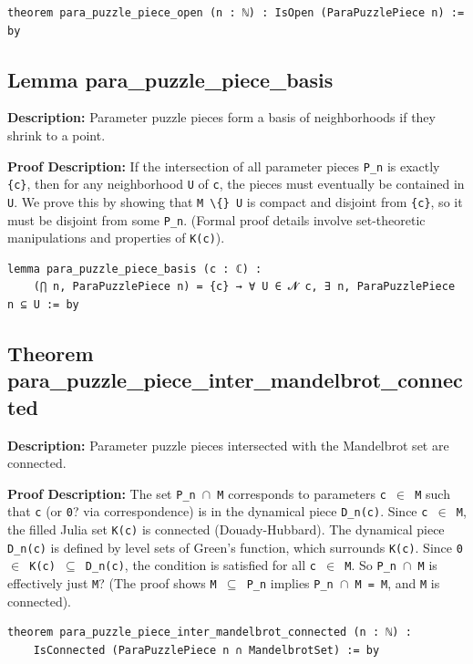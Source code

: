 \begin{lstlisting}[language=Lean]
theorem para_puzzle_piece_open (n : ℕ) : IsOpen (ParaPuzzlePiece n) := by
\end{lstlisting}

\subsection*{Lemma para\_puzzle\_piece\_basis}
\textbf{Description:} Parameter puzzle pieces form a basis of neighborhoods if they shrink to a point.

\textbf{Proof Description:} If the intersection of all parameter pieces \texttt{P\_n} is exactly \texttt{\{c\}}, then for any
    neighborhood \texttt{U} of \texttt{c}, the pieces must eventually be contained in \texttt{U}.
    We prove this by showing that \texttt{M \textbackslash\{\} U} is compact and disjoint from \texttt{\{c\}}, so it must be
    disjoint from some \texttt{P\_n}.
    (Formal proof details involve set-theoretic manipulations and properties of \texttt{K(c)}).

\begin{lstlisting}[language=Lean]
lemma para_puzzle_piece_basis (c : ℂ) :
    (⋂ n, ParaPuzzlePiece n) = {c} → ∀ U ∈ 𝓝 c, ∃ n, ParaPuzzlePiece n ⊆ U := by
\end{lstlisting}

\subsection*{Theorem para\_puzzle\_piece\_inter\_mandelbrot\_connected}
\textbf{Description:} Parameter puzzle pieces intersected with the Mandelbrot set are connected.

\textbf{Proof Description:} The set \texttt{P\_n $\cap$ M} corresponds to parameters \texttt{c $\in$ M} such that \texttt{c} (or \texttt{0}? via correspondence)
    is in the dynamical piece \texttt{D\_n(c)}.
    Since \texttt{c $\in$ M}, the filled Julia set \texttt{K(c)} is connected (Douady-Hubbard).
    The dynamical piece \texttt{D\_n(c)} is defined by level sets of Green's function, which surrounds \texttt{K(c)}.
    Since \texttt{0 $\in$ K(c) $\subseteq$ D\_n(c)}, the condition is satisfied for all \texttt{c $\in$ M}.
    So \texttt{P\_n $\cap$ M} is effectively just \texttt{M}?
    (The proof shows \texttt{M $\subseteq$ P\_n} implies \texttt{P\_n $\cap$ M = M}, and \texttt{M} is connected).

\begin{lstlisting}[language=Lean]
theorem para_puzzle_piece_inter_mandelbrot_connected (n : ℕ) :
    IsConnected (ParaPuzzlePiece n ∩ MandelbrotSet) := by
\end{lstlisting}

